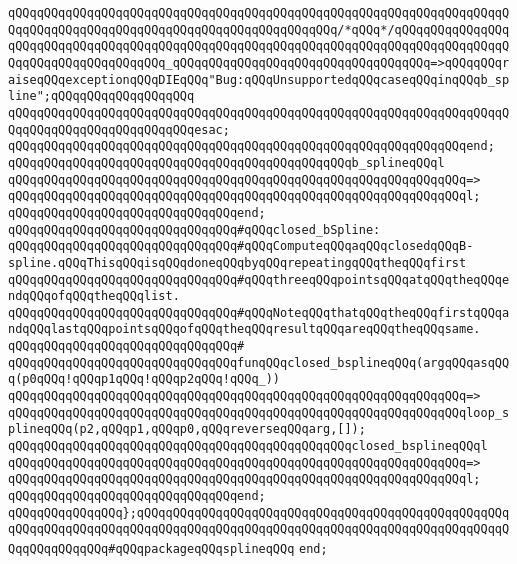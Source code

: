 \verb|qQQqqQQqqQQqqQQqqQQqqQQqqQQqqQQqqQQqqQQqqQQqqQQqqQQqqQQqqQQqqQQqqQQqqQQqqQQqqQQqqQQqqQQqqQQqqQQqqQQqqQQqqQQqqQQqqQQq/*qQQq*/qQQqqQQqqQQqqQQqqQQqqQQqqQQqqQQqqQQqqQQqqQQqqQQqqQQqqQQqqQQqqQQqqQQqqQQqqQQqqQQqqQQqqQQqqQQqqQQqqQQqqQQqqQQq_qQQqqQQqqQQqqQQqqQQqqQQqqQQqqQQqqQQq=>qQQqqQQqraiseqQQqexceptionqQQqDIEqQQq"Bug:qQQqUnsupportedqQQqcaseqQQqinqQQqb_spline";qQQqqQQqqQQqqQQqqQQq|\newline
\verb|qQQqqQQqqQQqqQQqqQQqqQQqqQQqqQQqqQQqqQQqqQQqqQQqqQQqqQQqqQQqqQQqqQQqqQQqqQQqqQQqqQQqqQQqqQQqqQQqesac;|\newline
\verb|qQQqqQQqqQQqqQQqqQQqqQQqqQQqqQQqqQQqqQQqqQQqqQQqqQQqqQQqqQQqqQQqend;|\newline
\newline
\verb|qQQqqQQqqQQqqQQqqQQqqQQqqQQqqQQqqQQqqQQqqQQqqQQqb_splineqQQql|\newline
\verb|qQQqqQQqqQQqqQQqqQQqqQQqqQQqqQQqqQQqqQQqqQQqqQQqqQQqqQQqqQQqqQQq=>|\newline
\verb|qQQqqQQqqQQqqQQqqQQqqQQqqQQqqQQqqQQqqQQqqQQqqQQqqQQqqQQqqQQqqQQql;|\newline
\verb|qQQqqQQqqQQqqQQqqQQqqQQqqQQqqQQqend;|\newline
\newline
\verb|qQQqqQQqqQQqqQQqqQQqqQQqqQQqqQQq#qQQqclosed_bSpline:|\newline
\verb|qQQqqQQqqQQqqQQqqQQqqQQqqQQqqQQq#qQQqComputeqQQqaqQQqclosedqQQqB-spline.qQQqThisqQQqisqQQqdoneqQQqbyqQQqrepeatingqQQqtheqQQqfirst|\newline
\verb|qQQqqQQqqQQqqQQqqQQqqQQqqQQqqQQq#qQQqthreeqQQqpointsqQQqatqQQqtheqQQqendqQQqofqQQqtheqQQqlist.|\newline
\verb|qQQqqQQqqQQqqQQqqQQqqQQqqQQqqQQq#qQQqNoteqQQqthatqQQqtheqQQqfirstqQQqandqQQqlastqQQqpointsqQQqofqQQqtheqQQqresultqQQqareqQQqtheqQQqsame.|\newline
\verb|qQQqqQQqqQQqqQQqqQQqqQQqqQQqqQQq#|\newline
\verb|qQQqqQQqqQQqqQQqqQQqqQQqqQQqqQQqfunqQQqclosed_bsplineqQQq(argqQQqasqQQq(p0qQQq!qQQqp1qQQq!qQQqp2qQQq!qQQq_))|\newline
\verb|qQQqqQQqqQQqqQQqqQQqqQQqqQQqqQQqqQQqqQQqqQQqqQQqqQQqqQQqqQQqqQQq=>|\newline
\verb|qQQqqQQqqQQqqQQqqQQqqQQqqQQqqQQqqQQqqQQqqQQqqQQqqQQqqQQqqQQqqQQqloop_splineqQQq(p2,qQQqp1,qQQqp0,qQQqreverseqQQqarg,[]);|\newline
\newline
\verb|qQQqqQQqqQQqqQQqqQQqqQQqqQQqqQQqqQQqqQQqqQQqqQQqclosed_bsplineqQQql|\newline
\verb|qQQqqQQqqQQqqQQqqQQqqQQqqQQqqQQqqQQqqQQqqQQqqQQqqQQqqQQqqQQqqQQq=>|\newline
\verb|qQQqqQQqqQQqqQQqqQQqqQQqqQQqqQQqqQQqqQQqqQQqqQQqqQQqqQQqqQQqqQQql;|\newline
\verb|qQQqqQQqqQQqqQQqqQQqqQQqqQQqqQQqend;|\newline
\verb|qQQqqQQqqQQqqQQq};qQQqqQQqqQQqqQQqqQQqqQQqqQQqqQQqqQQqqQQqqQQqqQQqqQQqqQQqqQQqqQQqqQQqqQQqqQQqqQQqqQQqqQQqqQQqqQQqqQQqqQQqqQQqqQQqqQQqqQQqqQQqqQQqqQQqqQQq#qQQqpackageqQQqsplineqQQq|\newline
\verb|end;|\newline
\newline

